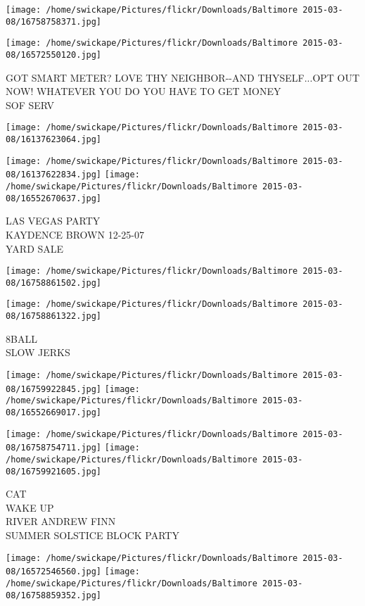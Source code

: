 \documentclass[10pt,letterpaper]{article}
\begin{document}
\texttt{[image: /home/swickape/Pictures/flickr/Downloads/Baltimore 2015-03-08/16758758371.jpg]}

\vspace{0.25in}
\texttt{[image: /home/swickape/Pictures/flickr/Downloads/Baltimore 2015-03-08/16572550120.jpg]}

GOT SMART METER? LOVE THY NEIGHBOR{-}{-}AND THYSELF...OPT OUT NOW!  WHATEVER YOU DO YOU HAVE TO GET MONEY\\
SOF SERV
\pagebreak

\texttt{[image: /home/swickape/Pictures/flickr/Downloads/Baltimore 2015-03-08/16137623064.jpg]}

\vspace{0.25in}
\texttt{[image: /home/swickape/Pictures/flickr/Downloads/Baltimore 2015-03-08/16137622834.jpg]}
\texttt{[image: /home/swickape/Pictures/flickr/Downloads/Baltimore 2015-03-08/16552670637.jpg]}

LAS VEGAS PARTY\\
KAYDENCE BROWN 12{-}25{-}07\\
YARD SALE
\pagebreak

\texttt{[image: /home/swickape/Pictures/flickr/Downloads/Baltimore 2015-03-08/16758861502.jpg]}

\vspace{0.25in}
\texttt{[image: /home/swickape/Pictures/flickr/Downloads/Baltimore 2015-03-08/16758861322.jpg]}

8BALL\\
SLOW JERKS
\pagebreak

\texttt{[image: /home/swickape/Pictures/flickr/Downloads/Baltimore 2015-03-08/16759922845.jpg]}
\texttt{[image: /home/swickape/Pictures/flickr/Downloads/Baltimore 2015-03-08/16552669017.jpg]}

\texttt{[image: /home/swickape/Pictures/flickr/Downloads/Baltimore 2015-03-08/16758754711.jpg]}
\texttt{[image: /home/swickape/Pictures/flickr/Downloads/Baltimore 2015-03-08/16759921605.jpg]}

CAT\\
WAKE UP\\
RIVER ANDREW FINN\\
SUMMER SOLSTICE BLOCK PARTY
\pagebreak

\texttt{[image: /home/swickape/Pictures/flickr/Downloads/Baltimore 2015-03-08/16572546560.jpg]}
\texttt{[image: /home/swickape/Pictures/flickr/Downloads/Baltimore 2015-03-08/16758859352.jpg]}
\end{document}
